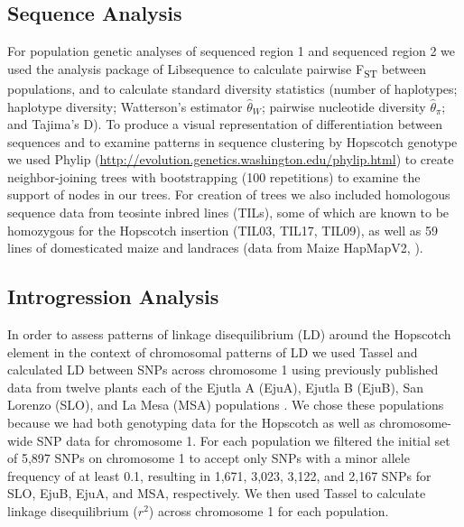 \documentclass[12pt]{article}
\begin{document}
\subsection*{Sequence Analysis}

For population genetic analyses of sequenced region 1 and sequenced region 2 we used the analysis package of Libsequence \citep{Thornton2003} to calculate pairwise F\textsubscript{ST} between populations, and to calculate standard diversity statistics (number of haplotypes; haplotype diversity; Watterson's estimator $\hat\theta_W$; pairwise nucleotide diversity $\hat\theta_\pi$; and Tajima's D). To produce a visual representation of differentiation between sequences and to examine patterns in sequence clustering by Hopscotch genotype we used Phylip (\url{http://evolution.genetics.washington.edu/phylip.html}) to create neighbor-joining trees with bootstrapping (100 repetitions) to examine the support of nodes in our trees. For creation of trees we also included homologous sequence data from teosinte inbred lines (TILs), some of which are known to be homozygous for the Hopscotch insertion (TIL03, TIL17, TIL09), as well as 59 lines of domesticated maize and landraces (data from Maize HapMapV2, \citep{Chia2012}).


\subsection*{Introgression Analysis}

In order to assess patterns of linkage disequilibrium (LD) around the Hopscotch element in the context of chromosomal patterns of LD we used Tassel \citep{Bradbury2007} and calculated LD between SNPs across chromosome 1 using previously published data from twelve plants each of the Ejutla A (EjuA), Ejutla B (EjuB), San Lorenzo (SLO), and La Mesa (MSA) populations \citep{Pyhajarvi2013}. We chose these populations because we had both genotyping data for the Hopscotch as well as chromosome-wide SNP data for chromosome 1. For each population we filtered the initial set of 5,897 SNPs on chromosome 1 to accept only SNPs with a minor allele frequency of at least 0.1, resulting in 1,671, 3,023, 3,122, and 2,167 SNPs for SLO, EjuB, EjuA, and MSA, respectively. We then used Tassel \citep{Bradbury2007} to calculate linkage disequilibrium ($r^{2}$) across chromosome 1 for each population. 
\end{document}
